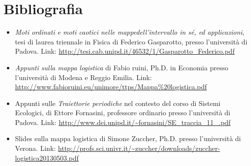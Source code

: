 \documentclass{article}
\theoremstyle{teorema}
\theoremstyle{definizione}
\begin{document}
\section*{Bibliografia}
\begin{itemize}
    \item \textit{Moti ordinati e moti caotici nelle mappedell’intervallo in sé, ed applicazioni}, tesi di laurea triennale in Fisica di Federico Gasparotto, presso l'università di Padova. Link: \url{http://tesi.cab.unipd.it/46532/1/Gasparotto_Federico.pdf}
    \item \textit{Appunti sulla mappa logistica} di Fabio ruini, Ph.D. in Economia presso l'università di Modena e Reggio Emilia. Link: \url{http://www.fabioruini.eu/unimore/ttps/Mappa%20logistica.pdf}
    \item Appunti sulle \textit{Traiettorie periodiche} nel contesto del corso di Sistemi Ecologici, di Ettore Fornasini, professore ordinario presso l'università di Padova. Link: \url{http://www.dei.unipd.it/~fornasini/SE_traccia_11_.pdf}
    \item Slides sulla mappa logistica di Simone Zuccher, Ph.D. presso l'università di Verona. Link: \url{http://profs.sci.univr.it/~zuccher/downloads/zuccher-logistica20130503.pdf}
\end{itemize}
\end{document}
